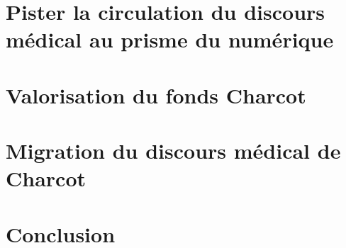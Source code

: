 \documentclass[a4paper,12pt]{book}
\begin{document}
\chapter{Pister la circulation du discours médical au prisme du numérique}


\chapter{Valorisation du fonds Charcot}

%
\chapter{Migration du discours médical de Charcot}

%
%
%
\chapter{Conclusion}



\newpage

\nocite{*}

%






\end{document}
